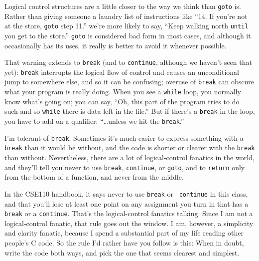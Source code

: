 Logical control structures are a little closer to the way we think than
{\tt goto} is.  Rather than giving someone a laundry list of
instructions like ``14. If you're not at the store, {\tt goto} step
11.'' we're more likely to say, ``Keep walking north {\tt until} you get
to the store.''  {\tt goto} is considered bad form in most cases, and
although it occasionally has its uses, it really is better to avoid it
whenever possible.

That warning extends to {\tt break} (and to {\tt continue}, although we
haven't seen that yet): {\tt break} interrupts the logical flow of
control and causes an unconditional jump to somewhere else, and so it
can be confusing; overuse of {\tt break} can obscure what your program
is really doing.  When you see a {\tt while} loop, you normally know
what's going on; you can say, ``Oh, this part of the program tries to do
such-and-so {\tt while} there is data left in the file.''  But if
there's a {\tt break} in the loop, you have to add on a qualifier:
``\ldots unless we hit the {\tt break}.''

I'm tolerant of {\tt break}.  Sometimes it's much easier to express
something with a {\tt break} than it would be without, and the code is
shorter or clearer with the {\tt break} than without.  Nevertheless,
there are a lot of logical-control fanatics in the world, and they'll
tell you never to use {\tt break}, {\tt continue}, or {\tt goto}, and to
{\tt return} only from the bottom of a function, and never from the
middle.  

In the CSE110 handbook, it says never to use {\tt break} or {\tt
continue} in this class, and that you'll lose at least one point on any
assignment you turn in that has a {\tt break} or a {\tt continue}.
That's the logical-control fanatics talking.  Since I am not a
logical-control fanatic, that rule goes out the window.  I am, however,
a simplicity and clarity fanatic, because I spend a substantial part of
my life reading other people's C code.  So the rule I'd rather have you
follow is this: When in doubt, write the code both ways, and pick the
one that seems clearest and simplest.


